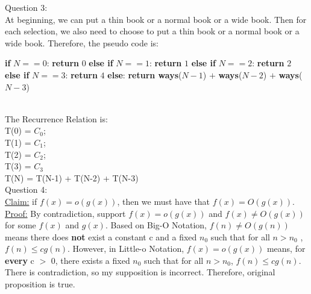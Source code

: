 \documentclass[12pt]{article}
\begin{document}
\pagebreak
\noindent
\large Question 3: \vspace{5mm} \\
\normalsize 
At beginning, we can put a thin book or a normal book or a wide book. Then for each selection, we also need to choose to put a thin book or a normal book or a wide book. Therefore, the pseudo code is: \\
\begin{algorithm}
\begin{algorithmic}
    \State \textbf{if} $N == 0$:
    \State \hspace{0.8cm}  \textbf{return} $0$
    \State \textbf{else if} $N == 1$:
    \State \hspace{0.8cm}  \textbf{return} $1$
    \State \textbf{else if} $N == 2$:
    \State \hspace{0.8cm}  \textbf{return} $2$
    \State \textbf{else if} $N == 3$:
    \State \hspace{0.8cm}  \textbf{return} $4$
    \State \textbf{else}:
    \State \hspace{0.8cm} \textbf{return ways}($N-1$) $+$ \textbf{ways}($N-2$) $+$ \textbf{ways}($N-3$)
\EndFunction
\end{algorithmic}
\end{algorithm}\\
The Recurrence Relation is: \\
T(0) = $C_0$; \\
T(1) = $C_1$;\\
T(2) = $C_2$;\\ 
T(3) = $C_3$ \\
T(N) = T(N-1) + T(N-2) + T(N-3) \\



\pagebreak
\large Question 4: \vspace{5mm}\\
\normalsize 
\underline{Claim:} if $f(x) = o(g(x))$, then we must have that $f(x) = O(g(x))$. \vspace{2mm}\\
\underline{Proof:} By contradiction, support $f(x) = o(g(x))$ and $f(x) \neq O(g(x))$ for some $f(x)$ and $g(x)$. Based on Big-O Notation, $f(n) \neq O(g(n))$ means there does \textbf{not} exist a constant c and a fixed $n_0$ such that for all $n > n_0$ , $f(n) \leq cg(n)$. However, in Little-o Notation, $f(x) = o(g(x))$ means, for \textbf{every} c $>$ 0, there exists a fixed $n_0$ such that for all $n > n_0$, $f(n) \leq cg(n)$. There is contradiction, so my supposition is incorrect. Therefore, original proposition is true.
\end{document}
